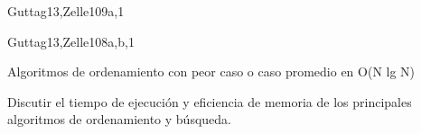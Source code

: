 \begin{syllabus}
\begin{unit}{\SDFFundamentalProgrammingConcepts}{}{Guttag13,Zelle10}{9}{a,1}
    \begin{learningoutcomes}
        \item \SDFFundamentalProgrammingConceptsLOAnalyzeAndBehavior [\Assessment] 
        \item \SDFFundamentalProgrammingConceptsLOIdentifyAndOf [\Familiarity]
        \item \SDFFundamentalProgrammingConceptsLOWritePrograms [\Usage] 
        \item \SDFFundamentalProgrammingConceptsLOModify [\Usage] 
        \item \SDFFundamentalProgrammingConceptsLODesignImplement [\Usage] 
        \item \SDFFundamentalProgrammingConceptsLOChooseAppropriateIteration [\Familiarity]
        \item \SDFFundamentalProgrammingConceptsLODescribeTheRecursion [\Assessment] 
        \item \SDFFundamentalProgrammingConceptsLOIdentifyTheAndCase [\Familiarity]
    \end{learningoutcomes}
\end{unit}

\begin{unit}{\ALFundamentalDataStructuresandAlgorithms}{}{Guttag13,Zelle10}{8}{a,b,1}
    \begin{topics}
       \item \ALFundamentalDataStructuresandAlgorithmsTopicSimple
       \item \ALFundamentalDataStructuresandAlgorithmsTopicWorst
       \item  Algoritmos de ordenamiento con peor caso o caso promedio en O(N lg N)
       \item \ALFundamentalDataStructuresandAlgorithmsTopicSequential
        
    \end{topics}

    \begin{learningoutcomes}
        \item \ALFundamentalDataStructuresandAlgorithmsLOImplement [\Usage] 
        \item \ALFundamentalDataStructuresandAlgorithmsLOImplementSimple [\Assessment] 
        \item \ALFundamentalDataStructuresandAlgorithmsLOBe [\Usage] 
        \item Discutir el tiempo de ejecución y eficiencia de memoria de los principales algoritmos de ordenamiento y búsqueda. 
        \item \ALFundamentalDataStructuresandAlgorithmsLODiscussFactors [\Familiarity]
        \item \ALFundamentalDataStructuresandAlgorithmsLODemonstrate [\Assessment] 
        \item \ALFundamentalDataStructuresandAlgorithmsLOTrace [\Usage] 
    \end{learningoutcomes}
\end{unit}


\end{syllabus}
